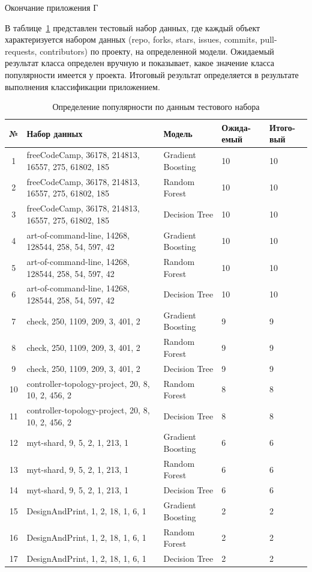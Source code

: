 \newpage
\begin{flushright}
Окончание приложения Г
\end{flushright}
\vspace{0.5em}


В таблице~\ref{tab:class} представлен тестовый набор данных, где каждый объект характеризуется набором данных  (repo, forks, stars, issues, commits, pull-requests, contributors) по проекту, на определенной модели. Ожидаемый результат класса определен вручную и показывает, какое значение класса популярности имеется у проекта. Итоговый результат определяется в результате выполнения классификации приложением.
\begin{table}[H]
    \caption{Определение популярности по данным тестового набора}
    \fontsize{12pt}{1em}\selectfont
    \vspace{1em}
    \begin{tabularx}{\linewidth}{|c|l|X|X|X|}
       \hline
        № & Набор данных & Модель & Ожида-емый & Итого-вый \\ \hline
 1 & freeCodeCamp, 36178, 214813, 16557, 275, 61802, 185 & Gradient Boosting & 10 &  10 \\ \hline
 2 & freeCodeCamp, 36178, 214813, 16557, 275, 61802, 185 & Random Forest & 10 & 10 \\ \hline
 3 & freeCodeCamp, 36178, 214813, 16557, 275, 61802, 185 & Decision Tree & 10 & 10 \\ \hline
 4 & art-of-command-line, 14268, 128544, 258, 54, 597, 42 & Gradient Boosting  & 10 & 10  \\ \hline
 5 & art-of-command-line, 14268, 128544, 258, 54, 597, 42 & Random Forest & 10 & 10  \\ \hline
 6 & art-of-command-line, 14268, 128544, 258, 54, 597, 42 & Decision Tree  & 10 & 10  \\ \hline
 7 & check, 250, 1109, 209, 3, 401, 2 & Gradient Boosting  & 9 & 9 \\ \hline
 8 & check, 250, 1109, 209, 3, 401, 2 & Random Forest  & 9 & 9 \\ \hline
 9 & check, 250, 1109, 209, 3, 401, 2 & Decision Tree  & 9 & 9 \\ \hline
 10 & controller-topology-project, 20, 8, 10, 2, 456, 2 & Random Forest  & 8 & 8 \\ \hline
 11 & controller-topology-project, 20, 8, 10, 2, 456, 2 & Decision Tree  & 8 & 8 \\ \hline
 12 & myt-shard, 9, 5, 2, 1, 213, 1 & Gradient Boosting  & 6 & 6 \\ \hline
 13 & myt-shard, 9, 5, 2, 1, 213, 1 & Random Forest  & 6 & 6 \\ \hline
 14 & myt-shard, 9, 5, 2, 1, 213, 1 & Decision Tree  & 6 & 6 \\ \hline
 15 & DesignAndPrint, 1, 2, 18, 1, 6, 1 & Gradient Boosting  & 2 & 2 \\ \hline
 16 & DesignAndPrint, 1, 2, 18, 1, 6, 1 & Random Forest  & 2 & 2 \\ \hline
 17 & DesignAndPrint, 1, 2, 18, 1, 6, 1 & Decision Tree  & 2 & 2 \\ \hline
        \end{tabularx} 
    \label{tab:class}
\end{table}
\vspace{1em}
